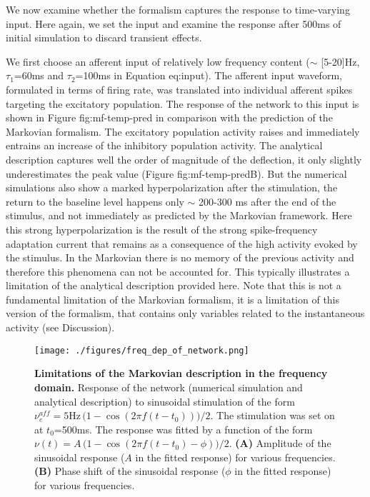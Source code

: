 \documentclass[8pt, colorlinks, a4paper]{article}
\renewcommand\ref{}
\begin{document}
We now examine whether the formalism captures the response to
time-varying input. Here again, we set the input and examine the
response after 500ms of initial simulation to discard transient
effects.

We first choose an afferent input of relatively low frequency content
(\(\sim\) [5-20]Hz, \( \tau_1 \)=60ms and \( \tau_2 \)=100ms in
Equation \ref{eq:input}). The afferent input waveform, formulated in
terms of firing rate, was translated into individual afferent spikes
targeting the excitatory population. The response of the network to
this input is shown in Figure \ref{fig:mf-temp-pred} in comparison
with the prediction of the Markovian formalism. The excitatory
population activity raises and immediately entrains an increase of the
inhibitory population activity. The analytical description captures
well the order of magnitude of the deflection, it only slightly
underestimates the peak value (Figure \ref{fig:mf-temp-pred}B). But
the numerical simulations also show a marked hyperpolarization after
the stimulation, the return to the baseline level happens only
\(\sim\) 200-300 ms after the end of the stimulus, and not immediately
as predicted by the Markovian framework. Here this strong
hyperpolarization is the result of the strong spike-frequency
adaptation current that remains as a consequence of the high activity
evoked by the stimulus. In the Markovian there is no memory of the
previous activity and therefore this phenomena can not be accounted
for. This typically illustrates a limitation of the analytical
description provided here. Note that this is not a fundamental
limitation of the Markovian formalism, it is a limitation of this
version of the formalism, that contains only variables related to the
instantaneous activity (see Discussion).

\begin{figure}[tb!]
\centering
\texttt{[image: ./figures/freq\_dep\_of\_network.png]}
\caption{\label{fig:mf-freq-dep}\textbf{Limitations of the Markovian description in the frequency domain.} Response of the network (numerical simulation and analytical description) to sinusoidal stimulation of the form \(\nu_e^{aff} = 5\mathrm{Hz} \, \big(1-\cos(2 \pi f (t-t_0))\big)/2\). The stimulation was set on at \(t_0\)=500ms. The response was fitted by a function of the form  \(\nu(t) = A \, \big(1-\cos(2 \pi f (t-t_0) - \phi)\big)/2\). \textbf{(A)} Amplitude of the sinusoidal response (\(A\) in the fitted response) for various frequencies. \textbf{(B)} Phase shift of the sinusoidal response (\(\phi\) in the fitted response) for various frequencies.}
\end{figure}
\end{document}
